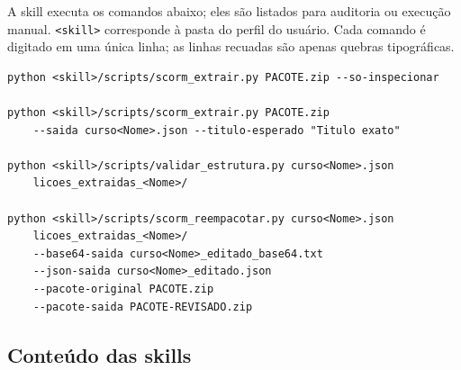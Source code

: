 \documentclass[12pt,a4paper]{article}
\begin{document}
A skill executa os comandos abaixo; eles são listados para auditoria ou execução manual. \texttt{<skill>} corresponde à pasta  do perfil do usuário. Cada comando é digitado em uma única linha; as linhas recuadas são apenas quebras tipográficas.

\begingroup\small{}
\begin{verbatim}
python <skill>/scripts/scorm_extrair.py PACOTE.zip --so-inspecionar

python <skill>/scripts/scorm_extrair.py PACOTE.zip
    --saida curso<Nome>.json --titulo-esperado "Titulo exato"

python <skill>/scripts/validar_estrutura.py curso<Nome>.json
    licoes_extraidas_<Nome>/

python <skill>/scripts/scorm_reempacotar.py curso<Nome>.json
    licoes_extraidas_<Nome>/
    --base64-saida curso<Nome>_editado_base64.txt
    --json-saida curso<Nome>_editado.json
    --pacote-original PACOTE.zip
    --pacote-saida PACOTE-REVISADO.zip
\end{verbatim}
\endgroup

\subsection*{Conteúdo das skills}
\end{document}
